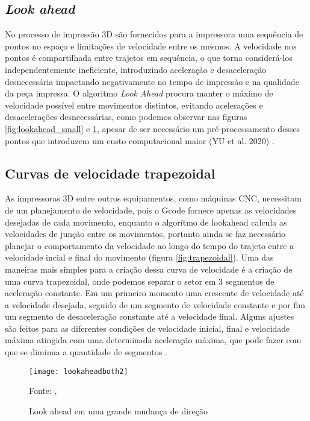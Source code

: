 \subsection{\textit{Look ahead}}
No processo de impressão 3D são fornecidos para a impressora 
uma sequência de pontos no espaço e limitações de velocidade 
entre os mesmos. A velocidade nos pontos é compartilhada entre 
trajetos em sequência, o que torna considerá-los 
independentemente ineficiente, introduzindo aceleração e 
desaceleração desnecessária impactando negativamente no tempo 
de impressão e na qualidade da peça impressa.
O algoritmo \textit{Look Ahead} procura manter o máximo de velocidade 
possível entre movimentos distintos, evitando acelerações e 
desacelerações desnecessárias, como podemos observar nas figuras 
\ref{fig:lookahead_small} e \ref{fig:lookahead_big}, 
apesar de ser necessário um 
pré-processamento desses pontos que introduzem um custo 
computacional maior (YU et al. 2020) \cite{yu20, klipperkinematic}.

\subsection{Curvas de velocidade trapezoidal}
As impressoras 3D entre outros equipamentos, como máquinas CNC, necessitam
de um planejamento de velocidade, pois o Gcode fornece apenas as velocidades desejadas
de cada movimento, enquanto o algorítmo de lookahead calcula as velocidades
de junção entre os movimentos, portanto ainda se faz necessário planejar
o comportamento da velocidade ao longo do tempo do trajeto entre a velocidade incial
e final do movimento (figura \ref{fig:trapezoidal}).
Uma das maneiras mais simples para a criação dessa curva de velocidade é
a criação de uma curva trapezoidal, onde podemos separar o setor em 3 segmentos
de aceleração constante. Em um primeiro momento uma crescente de velocidade até
a velocidade desejada, seguido de um segmento de velocidade constante e por fim
um segmento de desaceleração constante até a velocidade final.
Alguns ajustes são feitos para as diferentes condições de velocidade inicial, final e
velocidade máxima atingida com uma determinada aceleração máxima, que pode
fazer com que se diminua a quantidade de segmentos \cite{yu20,klipperkinematic}.

\begin{figure}[!htb]
    \centering
    \caption{Look ahead em uma grande mudança de direção}
    \texttt{[image: lookaheadboth2]}

    {\footnotesize Fonte: \citeauthor{klipperkinematic}, \citeyear{klipperkinematic}}
    \label{fig:lookahead_big}
\end{figure}

